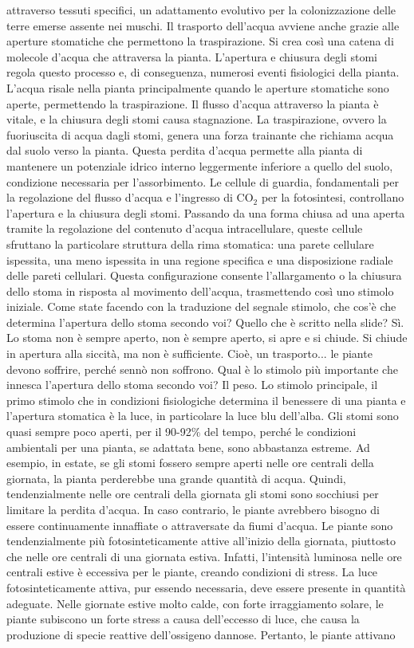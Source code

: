 \documentclass[11pt, a4paper]{article}
\begin{document}
\begin{spacing}{1.15}
attraverso tessuti specifici, un adattamento evolutivo per la colonizzazione delle terre emerse assente nei muschi.  Il trasporto dell'acqua avviene anche grazie alle aperture stomatiche che permettono la traspirazione. Si crea così una catena di molecole d'acqua che attraversa la pianta. L'apertura e chiusura degli stomi regola questo processo e, di conseguenza, numerosi eventi fisiologici della pianta. L'acqua risale nella pianta principalmente quando le aperture stomatiche sono aperte, permettendo la traspirazione. Il flusso d'acqua attraverso la pianta è vitale, e la chiusura degli stomi causa stagnazione. La traspirazione, ovvero la fuoriuscita di acqua dagli stomi, genera una forza trainante che richiama acqua dal suolo verso la pianta. Questa perdita d'acqua permette alla pianta di mantenere un potenziale idrico interno leggermente inferiore a quello del suolo, condizione necessaria per l'assorbimento. Le cellule di guardia, fondamentali per la regolazione del flusso d'acqua e l'ingresso di $\text{CO}_2$ per la fotosintesi, controllano l'apertura e la chiusura degli stomi.  Passando da una forma chiusa ad una aperta tramite la regolazione del contenuto d'acqua intracellulare,  queste cellule sfruttano la particolare struttura della rima stomatica: una parete cellulare ispessita, una meno ispessita in una regione specifica e una disposizione radiale delle pareti cellulari. Questa configurazione consente l'allargamento o la chiusura dello stoma in risposta al movimento dell'acqua, trasmettendo così uno stimolo iniziale. Come state facendo con la traduzione del segnale stimolo, che cos'è che determina l'apertura dello stoma secondo voi? Quello che è scritto nella slide? Sì. Lo stoma non è sempre aperto, non è sempre aperto, si apre e si chiude. Si chiude in apertura alla siccità, ma non è sufficiente. Cioè, un trasporto... le piante devono soffrire, perché sennò non soffrono. Qual è lo stimolo più importante che innesca l'apertura dello stoma secondo voi? Il peso. Lo stimolo principale, il primo stimolo che in condizioni fisiologiche determina il benessere di una pianta e l'apertura stomatica è la luce, in particolare la luce blu dell'alba. Gli stomi sono quasi sempre poco aperti, per il 90-92\% del tempo, perché le condizioni ambientali per una pianta, se adattata bene, sono abbastanza estreme. Ad esempio, in estate, se gli stomi fossero sempre aperti nelle ore centrali della giornata, la pianta perderebbe una grande quantità di acqua. Quindi, tendenzialmente nelle ore centrali della giornata gli stomi sono socchiusi per limitare la perdita d'acqua. In caso contrario, le piante avrebbero bisogno di essere continuamente innaffiate o attraversate da fiumi d'acqua. Le piante sono tendenzialmente più fotosinteticamente attive all'inizio della giornata, piuttosto che nelle ore centrali di una giornata estiva. Infatti, l'intensità luminosa nelle ore centrali estive è eccessiva per le piante, creando condizioni di stress. La luce fotosinteticamente attiva, pur essendo necessaria, deve essere presente in quantità adeguate. Nelle giornate estive molto calde, con forte irraggiamento solare, le piante subiscono un forte stress a causa dell'eccesso di luce, che causa la produzione di specie reattive dell'ossigeno dannose. Pertanto, le piante attivano 
\end{spacing}
\end{document}
